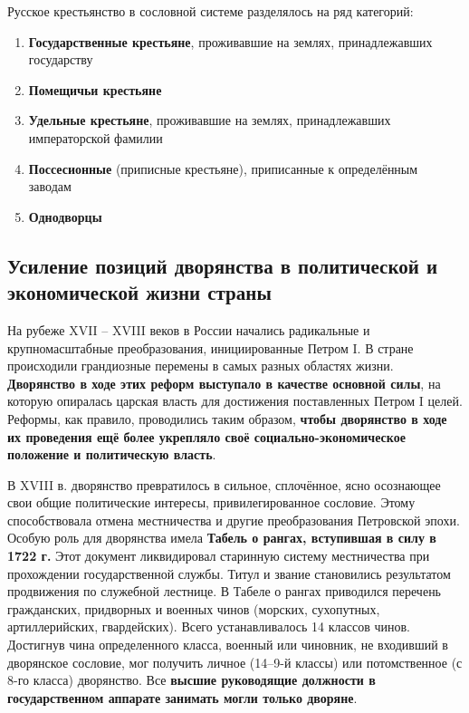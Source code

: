 \documentclass{article}
\begin{document}
Русское крестьянство в сословной системе разделялось на ряд категорий:
\begin{enumerate}
    \item \textbf{Государственные крестьяне}, проживавшие на землях, принадлежавших государству
    \item \textbf{Помещичьи крестьяне}
    \item \textbf{Удельные крестьяне}, проживавшие на землях, принадлежавших императорской фамилии
    \item \textbf{Поссесионные} (приписные крестьяне), приписанные к определённым заводам
    \item \textbf{Однодворцы}
\end{enumerate}

\subsection{Усиление позиций дворянства в политической и экономической жизни страны}

На рубеже XVII – XVIII веков в России начались радикальные и крупномасштабные преобразования, инициированные Петром I. В стране происходили грандиозные перемены в самых разных областях жизни. \textbf{Дворянство в ходе этих реформ выступало в качестве основной силы}, на которую опиралась царская власть для достижения поставленных Петром I целей. Реформы, как правило, проводились таким образом, \textbf{чтобы дворянство в ходе их проведения ещё более укрепляло своё социально-экономическое положение и политическую власть}.

\hfill

В XVIII в. дворянство превратилось в сильное, сплочённое, ясно осознающее свои общие политические интересы, привилегированное сословие. Этому способствовала отмена местничества и другие преобразования Петровской эпохи. Особую роль для дворянства имела \textbf{Табель о рангах, вступившая в силу в 1722 г.} Этот документ ликвидировал старинную систему местничества при прохождении государственной службы. Титул и звание становились результатом продвижения по служебной лестнице. В Табеле о рангах приводился перечень гражданских, придворных и военных чинов (морских, сухопутных, артиллерийских, гвардейских). Всего устанавливалось 14 классов чинов. Достигнув чина определенного класса, военный или чиновник, не входивший в дворянское сословие, мог получить личное (14–9-й классы) или потомственное (с 8-го класса) дворянство. Все \textbf{высшие руководящие должности в государственном аппарате занимать могли только дворяне}.
\end{document}
